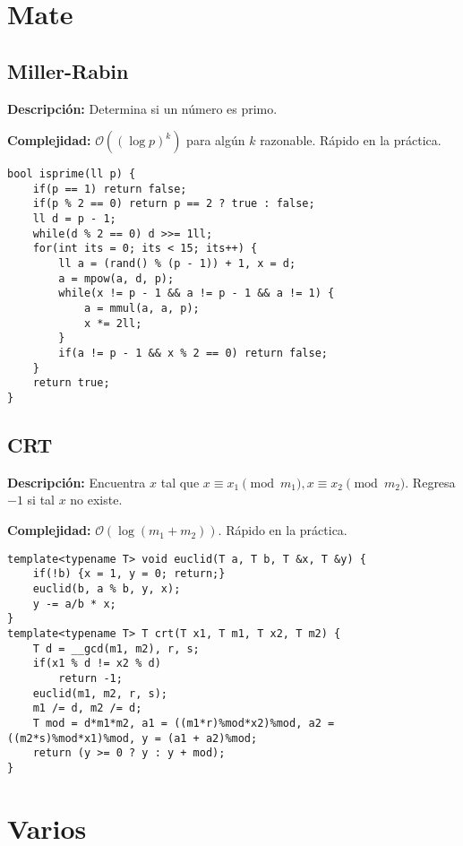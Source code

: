 \documentclass[twocolumn]{article}
\begin{document}
\section{Mate}
\subsection{Miller-Rabin}
\begin{footnotesize}{\bf Descripción: } Determina si un número es primo.


{\bf Complejidad: } $\mathcal{O}((\log p)^k)$ para algún $k$ razonable. Rápido en la práctica.
\end{footnotesize}\lstset{basicstyle=\footnotesize\ttfamily,breaklines=true,tabsize=2,language=C++,frame=leftline, numbers=left, numberstyle=\tiny, numbersep=5pt}
\begin{lstlisting}
bool isprime(ll p) {
	if(p == 1) return false;
	if(p % 2 == 0) return p == 2 ? true : false;
	ll d = p - 1;
	while(d % 2 == 0) d >>= 1ll;
	for(int its = 0; its < 15; its++) {
		ll a = (rand() % (p - 1)) + 1, x = d;
		a = mpow(a, d, p);
		while(x != p - 1 && a != p - 1 && a != 1) {
			a = mmul(a, a, p);
			x *= 2ll;
		}
		if(a != p - 1 && x % 2 == 0) return false;
	}
	return true;
}
\end{lstlisting}
\subsection{CRT}
\begin{footnotesize}{\bf Descripción: } Encuentra $x$ tal que $x \equiv x_1 \pmod{m_1}, x \equiv x_2 \pmod{m_2}$. Regresa $-1$ si tal $x$ no existe.


{\bf Complejidad: } $\mathcal{O}(\log(m_1 + m_2))$. Rápido en la práctica.
\end{footnotesize}\lstset{basicstyle=\footnotesize\ttfamily,breaklines=true,tabsize=2,language=C++,frame=leftline, numbers=left, numberstyle=\tiny, numbersep=5pt}
\begin{lstlisting}
template<typename T> void euclid(T a, T b, T &x, T &y) {
	if(!b) {x = 1, y = 0; return;}
	euclid(b, a % b, y, x);
	y -= a/b * x;
}
template<typename T> T crt(T x1, T m1, T x2, T m2) {
	T d = __gcd(m1, m2), r, s;
	if(x1 % d != x2 % d)
		return -1;
	euclid(m1, m2, r, s);
	m1 /= d, m2 /= d;
	T mod = d*m1*m2, a1 = ((m1*r)%mod*x2)%mod, a2 = ((m2*s)%mod*x1)%mod, y = (a1 + a2)%mod;
	return (y >= 0 ? y : y + mod);
}
\end{lstlisting}
\section{Varios}
\end{document}
